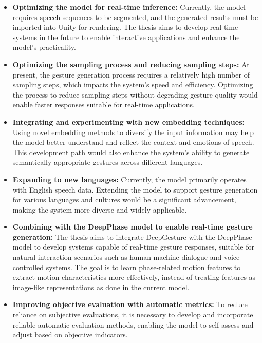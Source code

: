 \begin{itemize}
	\item \textbf{Optimizing the model for real-time inference:} Currently, the model requires speech sequences to be segmented, and the generated results must be imported into Unity for rendering. The thesis aims to develop real-time systems in the future to enable interactive applications and enhance the model's practicality.
	
	\item \textbf{Optimizing the sampling process and reducing sampling steps:} At present, the gesture generation process requires a relatively high number of sampling steps, which impacts the system’s speed and efficiency. Optimizing the process to reduce sampling steps without degrading gesture quality would enable faster responses suitable for real-time applications.
	
	\item \textbf{Integrating and experimenting with new embedding techniques:} Using novel embedding methods to diversify the input information may help the model better understand and reflect the context and emotions of speech. This development path would also enhance the system’s ability to generate semantically appropriate gestures across different languages.
	
	\item \textbf{Expanding to new languages:} Currently, the model primarily operates with English speech data. Extending the model to support gesture generation for various languages and cultures would be a significant advancement, making the system more diverse and widely applicable.
	
	\item \textbf{Combining with the DeepPhase model \cite{starke2022deepphase} to enable real-time gesture generation:} The thesis aims to integrate DeepGesture with the DeepPhase model to develop systems capable of real-time gesture responses, suitable for natural interaction scenarios such as human-machine dialogue and voice-controlled systems. The goal is to learn phase-related motion features to extract motion characteristics more effectively, instead of treating features as image-like representations as done in the current model.
	
	\item \textbf{Improving objective evaluation with automatic metrics:} To reduce reliance on subjective evaluations, it is necessary to develop and incorporate reliable automatic evaluation methods, enabling the model to self-assess and adjust based on objective indicators.
\end{itemize}
